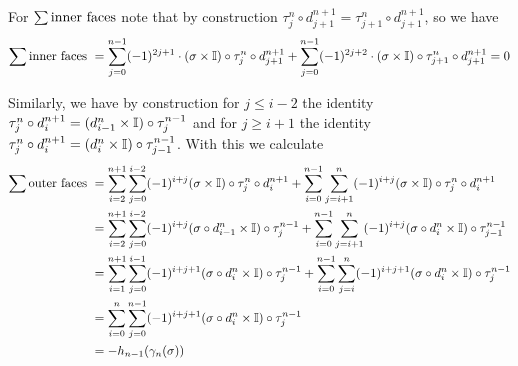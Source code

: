 \begin{sketch}
		For $\sum \text{inner faces}$ note that by construction $\tau_j^n \circ d_{j+1}^{n+1} = \tau_{j+1}^n \circ d_{j+1}^{n+1}$, so we have
		\begin{align*}
			\sum \text{inner faces } = \sum \limits_{j=0}^{n-1}(-1)^{2j+1} \cdot (\sigma \times \mathbb{I}) \circ \tau_j^n \circ d_{j+1}^{n+1} + \sum \limits_{j=0}^{n-1}(-1)^{2j+2} \cdot (\sigma \times \mathbb{I}) \circ \tau_{j+1}^n \circ d_{j+1}^{n+1} = 0
		\end{align*}

		Similarly, we have by construction for $j \leq i-2$  the identity $\tau_j^n \circ d_i^{n+1} = (d_{i-1}^n \times \mathbb{I}) \circ \tau_j^{n-1}$ and for $j \geq i+1$ the identity $\tau_j^n \circ d_i^{n+1} = (d_i^n \times \mathbb{I}) \circ \tau_{j-1}^{n-1}$. With this we calculate
		\begin{align*}
			\sum \text{outer faces } &= \sum \limits_{i=2}^{n+1}\sum \limits_{j=0}^{i-2}(-1)^{i+j}(\sigma \times \mathbb{I}) \circ \tau_j^n \circ d_i^{n+1} + \sum \limits_{i=0}^{n-1}\sum \limits_{j=i+1}^n (-1)^{i+j}(\sigma \times \mathbb{I}) \circ \tau_j^n \circ d_i^{n+1}\\
			&= \sum \limits_{i=2}^{n+1}\sum \limits_{j=0}^{i-2}(-1)^{i+j}(\sigma \circ d_{i-1}^n \times \mathbb{I}) \circ \tau_j^{n-1} + \sum \limits_{i=0}^{n-1}\sum \limits_{j=i+1}^n (-1)^{i+j}(\sigma \circ d_i^n \times \mathbb{I}) \circ \tau_{j-1}^{n-1}\\
			&= \sum \limits_{i=1}^{n+1}\sum \limits_{j=0}^{i-1}(-1)^{i+j+1}(\sigma \circ d_{i}^n \times \mathbb{I}) \circ \tau_j^{n-1} + \sum \limits_{i=0}^{n-1}\sum \limits_{j=i}^n (-1)^{i+j+1}(\sigma \circ d_i^n \times \mathbb{I}) \circ \tau_{j}^{n-1}\\
			&= \sum \limits_{i=0}^{n}\sum \limits_{j=0}^{n-1}(-1)^{i+j+1}(\sigma \circ d_i^n \times \mathbb{I}) \circ \tau_j^{n-1}\\
			&= -h_{n-1}(\gamma_n(\sigma))
		\end{align*}
	\end{sketch}

